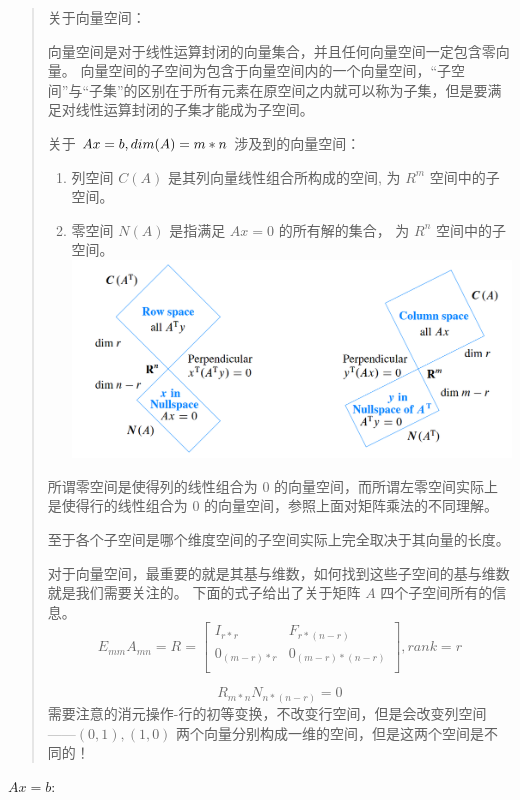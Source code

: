 \documentclass[
  letterpaper,
  DIV=11,
  numbers=noendperiod]{scrartcl}
\providecommand{\tightlist}{%
  \setlength{\itemsep}{0pt}\setlength{\parskip}{0pt}}\usepackage{longtable,booktabs,array}
\begin{document}
\begin{quote}
关于向量空间：

向量空间是对于线性运算封闭的向量集合，并且任何向量空间一定包含零向量。
向量空间的子空间为包含于向量空间内的一个向量空间，``子空间''与``子集''的区别在于所有元素在原空间之内就可以称为子集，但是要满足对线性运算封闭的子集才能成为子空间。

关于 \(Ax = b, \space dim(A) = m * n\) 涉及到的向量空间：

\begin{enumerate}
\def\labelenumi{\arabic{enumi}.}
\tightlist
\item
  列空间 \(C(A)\) 是其列向量线性组合所构成的空间, 为 \(R^m\)
  空间中的子空间。
\item
  零空间 \(N(A)\) 是指满足 \(Ax = 0\) 的所有解的集合， 为 \(R^n\)
  空间中的子空间。 \includegraphics{figures/four_subspace.png}
\end{enumerate}

所谓零空间是使得列的线性组合为 0
的向量空间，而所谓左零空间实际上是使得行的线性组合为 0
的向量空间，参照上面对矩阵乘法的不同理解。

至于各个子空间是哪个维度空间的子空间实际上完全取决于其向量的长度。

对于向量空间，最重要的就是其基与维数，如何找到这些子空间的基与维数就是我们需要关注的。
下面的式子给出了关于矩阵 \(A\) 四个子空间所有的信息。 \[
E_{mm}A_{mn}= R = \begin{bmatrix} I_{r*r} & F_{r*(n-r)} \\
0_{(m-r)*r} & 0_{(m-r)*(n-r)} \\
\end{bmatrix}, rank = r
\]

\[
R_{m*n} N_{n*(n-r)} = 0
\]
需要注意的消元操作-行的初等变换，不改变行空间，但是会改变列空间------\((0, 1), (1, 0)\)
两个向量分别构成一维的空间，但是这两个空间是不同的！
\end{quote}

\(Ax = b\):
\end{document}
